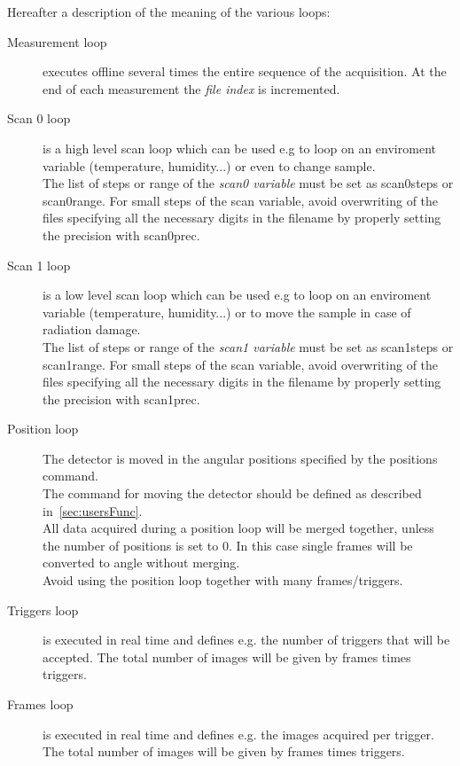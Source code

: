 Hereafter a description of the meaning of the various loops:
\begin{description}
\item[Measurement loop] executes offline several times the entire sequence of the acquisition. At the end of each measurement the \textit{file index} is incremented.

\item[Scan 0 loop]
  is a high level scan loop which can be used e.g to loop on an enviroment variable (temperature, humidity...) or even to change sample.\\
 The list of steps or range of the \textit{scan0 variable} must be set as scan0steps or scan0range. For small steps of the scan variable, avoid overwriting of the files specifying all the necessary digits in the filename by properly setting the precision with scan0prec.

\item[Scan 1 loop]
  is a low level scan loop which can be used e.g to loop on an enviroment variable (temperature, humidity...) or to move the sample in case of radiation damage.\\
 The list of steps or range of the \textit{scan1 variable} must be set as scan1steps or scan1range. For small steps of the scan variable, avoid overwriting of the files specifying all the necessary digits in the filename by properly setting the precision with scan1prec.

\item[Position loop]
 The detector is moved in the angular positions specified by the positions command.\\
 The command for moving the detector should be defined as described in~\ref{sec:usersFunc}.\\
 All data acquired during a position loop will be merged together, unless the number of positions is set to 0. In this case single frames will be converted to angle without merging.\\
 Avoid using the position loop together with many frames/triggers.

\item[Triggers loop] is executed in real time and defines e.g. the number of triggers that will be accepted. The total number of images will be given by frames times triggers.

\item[Frames loop] is executed in real time and defines e.g. the images acquired per trigger. The total number of images will be given by frames times triggers.
\end{description}

